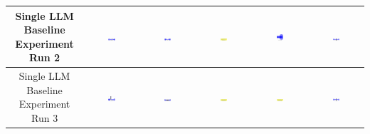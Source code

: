 \begin{table}[H]
\begin{tabular}{|c|c|c|c|c|c|}
    \hline
    Single LLM Baseline Experiment Run 2 & \includegraphics[width=0.15\textwidth]{./run_2/png/gpt-4o_results/DLDChip.png} & \includegraphics[width=0.15\textwidth]{./run_2/png/claude-3-5-sonnet-20240620_results/DLDChip.png} & \includegraphics[width=0.15\textwidth]{./run_2/png/watsonx_meta-llama_llama-3-1-70b-instruct_results/DLDChip.png} & \includegraphics[width=0.15\textwidth]{./run_2/png/watsonx_meta-llama_llama-3-405b-instruct_results/DLDChip.png} & \includegraphics[width=0.15\textwidth]{./run_2/png/o1-preview_results/DLDChip.png} \\
    \hline
    Single LLM Baseline Experiment Run 3 & \includegraphics[width=0.15\textwidth]{./run_3/png/gpt-4o_results/DLDChip.png} & \includegraphics[width=0.15\textwidth]{./run_3/png/claude-3-5-sonnet-20240620_results/DLDChip.png} & \includegraphics[width=0.15\textwidth]{./run_3/png/watsonx_meta-llama_llama-3-1-70b-instruct_results/DLDChip.png} & \includegraphics[width=0.15\textwidth]{./run_3/png/watsonx_meta-llama_llama-3-405b-instruct_results/DLDChip.png} & \includegraphics[width=0.15\textwidth]{./run_3/png/o1-preview_results/DLDChip.png} \\

\end{tabular}
\end{table}

